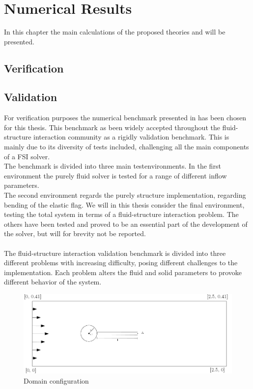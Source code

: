 \chapter{Numerical Results}

In this chapter the main calculations of the proposed theories and will be presented. 

\section{Verification}

\section{Validation}
For verification purposes the numerical benchmark presented in \cite{Hron2006} has been chosen for this thesis. This benchmark as been widely accepted throughout the fluid-structure interaction community as a rigidly validation benchmark. This is mainly due to its diversity of tests included, challenging all the main components of a FSI solver. \\
The benchmark is divided into three main testenvironments.
In the first environment the purely fluid solver is tested for a range of different inflow parameters. \\
The second environment regards the purely structure implementation, regarding bending of the elastic flag. We will in this thesis consider the final environment, testing the total system in terms of a fluid-structure interaction problem. The others have been tested and proved to be an essential part of the development of the solver, but will for brevity not be reported. \\ \\

The fluid-structure interaction validation benchmark is divided into three different problems with increasing difficulty, posing different challenges to the implementation. 
Each problem alters the fluid and solid parameters to provoke different behavior of the system.

\begin{figure}
  \caption{Domain configuration}
  \centering
    \includegraphics[scale=0.5]{./Fig/turekflag.png}
\end{figure}


